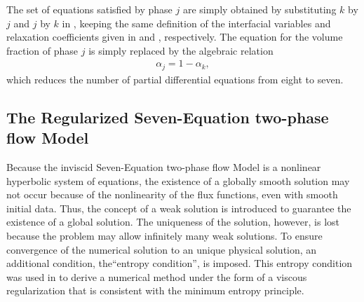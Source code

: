 \documentclass[preprint,10pt]{elsarticle}
\begin{document}
The set of equations satisfied by phase $j$ are simply obtained by substituting $k$ by $j$ and $j$ by $k$ in , keeping 
the same definition of the interfacial variables and relaxation coefficients given in  and , respectively. The 
equation for the volume fraction of phase $j$ 
is simply replaced by the algebraic relation
%
\begin{align}
 \alpha_{j}= 1 - \alpha_{k}, \nonumber
\end{align}
%
which reduces the number of partial differential equations from eight to seven. %
%
\subsection{The Regularized Seven-Equation two-phase flow Model}\label{sec:ref-sem}
%
Because the inviscid Seven-Equation two-phase flow Model is a nonlinear hyperbolic system of equations, the existence of a 
globally smooth solution may not occur because of the nonlinearity of the flux functions, even with smooth initial data. Thus, the concept of a weak
solution is introduced to guarantee the existence of a global solution. The uniqueness of the solution, however, is lost because the problem may
allow infinitely many weak solutions. To ensure convergence of the numerical solution to an unique physical solution, an additional condition, 
the``entropy condition'', is imposed. This entropy condition was used 
in \cite{Marco_paper_sem} to derive a numerical method under the form of a viscous regularization that is consistent with the minimum entropy principle. 
\end{document}
